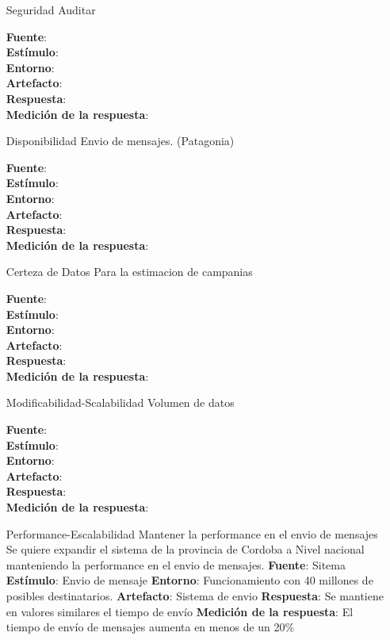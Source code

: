 \documentclass[a4paper, 11pt]{article}
\begin{document}
\begin{itemize}
\item[Seguridad]Auditar


\textbf{Fuente}:  \\
\textbf{Estímulo}: \\
\textbf{Entorno}: \\
\textbf{Artefacto}: \\
\textbf{Respuesta}: \\
\textbf{Medición de la respuesta}: \\

\item[Disponibilidad] Envio de mensajes. (Patagonia)


\textbf{Fuente}:  \\
\textbf{Estímulo}: \\
\textbf{Entorno}: \\
\textbf{Artefacto}: \\
\textbf{Respuesta}: \\
\textbf{Medición de la respuesta}: \\


\item[Certeza de Datos] Para la estimacion de campanias

\textbf{Fuente}:  \\
\textbf{Estímulo}: \\
\textbf{Entorno}: \\
\textbf{Artefacto}: \\
\textbf{Respuesta}: \\
\textbf{Medición de la respuesta}: \\

\item[Modificabilidad-Scalabilidad] Volumen de datos


\textbf{Fuente}:  \\
\textbf{Estímulo}: \\
\textbf{Entorno}: \\
\textbf{Artefacto}: \\
\textbf{Respuesta}: \\
\textbf{Medición de la respuesta}: \\

\item[Performance-Escalabilidad] Mantener la performance en el envio de mensajes
Se quiere expandir el sistema de la provincia de Cordoba a Nivel nacional manteniendo la performance en el envio de mensajes.
\textbf{Fuente}: Sitema
\textbf{Estímulo}: Envio de mensaje
\textbf{Entorno}: Funcionamiento con 40 millones de posibles destinatarios.
\textbf{Artefacto}: Sistema de envio
\textbf{Respuesta}: Se mantiene en valores similares el tiempo de envío
\textbf{Medición de la respuesta}: El tiempo de envío de mensajes aumenta en menos de un 20\%


\end{itemize}
\end{document}
